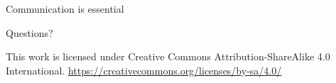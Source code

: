 \documentclass[11pt,xetex]{beamer}
\begin{document}
\begin{frame}{}
  \begin{center}
    \Huge
    Communication is essential
  \end{center}
\end{frame}

\begin{frame}[standout]{}
  \begin{center}
    \Huge
    Questions?
  \end{center}
\end{frame}

\begin{frame}[standout]{}
  \begin{center}
    This work is licensed under Creative Commons Attribution-ShareAlike 4.0 International.
    \url{https://creativecommons.org/licenses/by-sa/4.0/}
  \end{center}
\end{frame}
\end{document}

